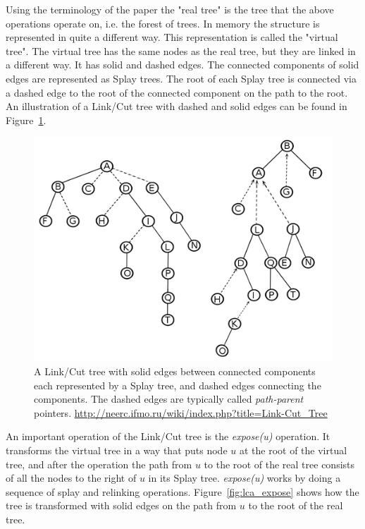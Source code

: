 \documentclass[a4paper,oneside,article,11pt]{memoir}
\begin{document}
Using the terminology of the paper the "real tree" is the tree that the above operations operate on, i.e. the forest of trees. In memory the structure is represented in quite a different way. This representation is called the "virtual tree". The virtual tree has the same nodes as the real tree, but they are linked in a different way. It has solid and dashed edges. The connected components of solid edges are represented as Splay trees. The root of each Splay tree is connected via a dashed edge to the root of the connected component on the path to the root. An illustration of a Link/Cut tree with dashed and solid edges can be found in Figure~\ref{fig:lca_linkcut}.

\begin{figure}
\includegraphics[width=\textwidth]{../figures/linkcut-tree.png}
\caption{\label{fig:lca_linkcut}A Link/Cut tree with solid edges between connected components each represented by a Splay tree, and dashed edges connecting the components. The dashed edges are typically called \textit{path-parent} pointers. \url{http://neerc.ifmo.ru/wiki/index.php?title=Link-Cut_Tree}
}
\end{figure}

An important operation of the Link/Cut tree is the \textit{expose(u)} operation. It transforms the virtual tree in a way that puts node $u$ at the root of the virtual tree, and after the operation the path from $u$ to the root of the real tree consists of all the nodes to the right of $u$ in its Splay tree. \textit{expose(u)} works by doing a sequence of splay and relinking operations. Figure~\ref{fig:lca_expose} shows how the tree is transformed with solid edges on the path from $u$ to the root of the real tree.
\end{document}

